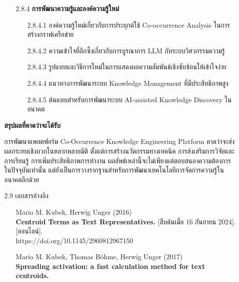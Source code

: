 \documentclass[12pt,a4paper]{article}
\newcommand{\textlight}[1]{{\thailightfont #1}}
\begin{document}
\begin{enumerate}[leftmargin=2cm]
{\begin{enumerate}
            \item[2.8.4] \textbf{การพัฒนาความรู้และองค์ความรู้ใหม่}
            \begin{enumerate}
                \item[2.8.4.1] องค์ความรู้ใหม่เกี่ยวกับการประยุกต์ใช้ Co-occurrence Analysis ในการสร้างกราฟเครือข่าย
                \item[2.8.4.2] ความเข้าใจที่ลึกซึ้งเกี่ยวกับการบูรณาการ LLM กับระบบวิศวกรรมความรู้
                \item[2.8.4.3] รูปแบบและวิธีการใหม่ในการแสดงผลความสัมพันธ์เชิงซับซ้อนให้เข้าใจง่าย
                \item[2.8.4.4] แนวทางการพัฒนาระบบ Knowledge Management ที่มีประสิทธิภาพสูง
                \item[2.8.4.5] ต้นแบบสำหรับการพัฒนาระบบ AI-assisted Knowledge Discovery ในอนาคต
            \end{enumerate}
        \end{enumerate}

        \vspace{0.8cm}

        \textbf{สรุปผลที่คาดว่าจะได้รับ}

        \hspace{1cm}การพัฒนาแพลตฟอร์ม Co-Occurrence Knowledge Engineering Platform คาดว่าจะส่งผลกระทบเชิงบวกในหลากหลายมิติ ตั้งแต่การสร้างนวัตกรรมทางเทคนิค การส่งเสริมการวิจัยและการเรียนรู้ การเพิ่มประสิทธิภาพการทำงาน ผลลัพธ์เหล่านี้จะไม่เพียงแต่ตอบสนองความต้องการในปัจจุบันเท่านั้น แต่ยังเป็นการวางรากฐานสำหรับการพัฒนาเทคโนโลยีการจัดการความรู้ในอนาคตอีกด้วย
    }

    \vspace{11cm}

    \item[2.9] เอกสารอ้างอิง
    \\
    \textlight{
        \begin{enumerate}
            \item[] Mario M. Kubek, Herwig Unger (2016) \\
            \textbf{Centroid Terms as Text Representatives.}
            [สืบค้นเมื่อ 16 กันยายน 2024]. [ออนไลน์]. \\ https://doi.org/10.1145/2960812967150

            \item[] Mario M. Kubek, Thomas Böhme, Herwig Unger (2017) \\
            \textbf{Spreading activation: a fast calculation method for text centroids.}


\end{enumerate}}
\end{enumerate}
\end{document}

